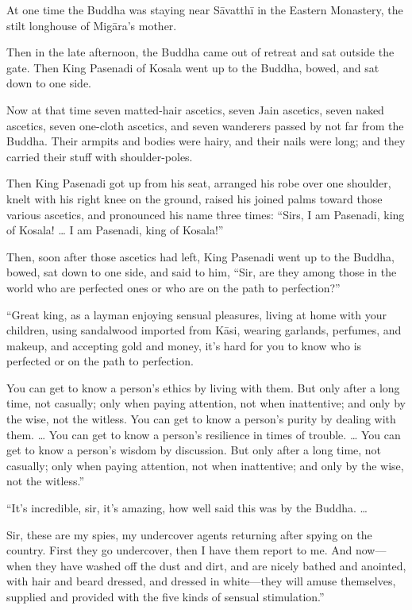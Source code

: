 \documentclass[12pt,openany]{book}%
\begin{document}
At one time the Buddha was staying near \textsanskrit{Sāvatthī} in the Eastern Monastery, the stilt longhouse of \textsanskrit{Migāra}’s mother. 

Then in the late afternoon, the Buddha came out of retreat and sat outside the gate. Then King Pasenadi of Kosala went up to the Buddha, bowed, and sat down to one side. 

Now at that time seven matted-hair ascetics, seven Jain ascetics, seven naked ascetics, seven one-cloth ascetics, and seven wanderers passed by not far from the Buddha. Their armpits and bodies were hairy, and their nails were long; and they carried their stuff with shoulder-poles. 

Then King Pasenadi got up from his seat, arranged his robe over one shoulder, knelt with his right knee on the ground, raised his joined palms toward those various ascetics, and pronounced his name three times: “Sirs, I am Pasenadi, king of Kosala! … I am Pasenadi, king of Kosala!” 

Then, soon after those ascetics had left, King Pasenadi went up to the Buddha, bowed, sat down to one side, and said to him, “Sir, are they among those in the world who are perfected ones or who are on the path to perfection?” 

“Great king, as a layman enjoying sensual pleasures, living at home with your children, using sandalwood imported from \textsanskrit{Kāsi}, wearing garlands, perfumes, and makeup, and accepting gold and money, it’s hard for you to know who is perfected or on the path to perfection. 

You can get to know a person’s ethics by living with them. But only after a long time, not casually; only when paying attention, not when inattentive; and only by the wise, not the witless. You can get to know a person’s purity by dealing with them. … You can get to know a person’s resilience in times of trouble. … You can get to know a person’s wisdom by discussion. But only after a long time, not casually; only when paying attention, not when inattentive; and only by the wise, not the witless.” 

“It’s incredible, sir, it’s amazing, how well said this was by the Buddha. … 

Sir, these are my spies, my undercover agents returning after spying on the country. First they go undercover, then I have them report to me. And now—when they have washed off the dust and dirt, and are nicely bathed and anointed, with hair and beard dressed, and dressed in white—they will amuse themselves, supplied and provided with the five kinds of sensual stimulation.” 
\end{document}
